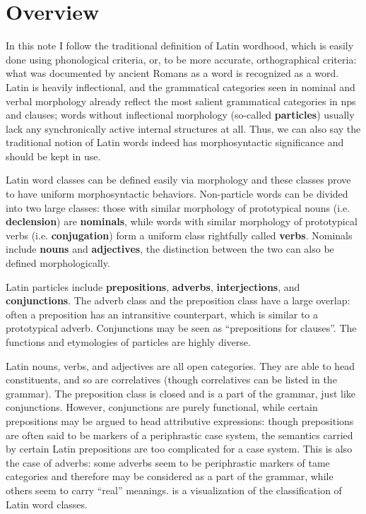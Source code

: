 \documentclass[a4paper, oneside]{report}
\newcommand*{\concept}[1]{\textbf{#1}}
\begin{document}
\section{Overview}

In this note I follow the traditional definition of Latin wordhood,
which is easily done using phonological criteria,
or, to be more accurate, orthographical criteria: 
what was documented by ancient Romans as a word 
is recognized as a word.
Latin is heavily inflectional,
and the grammatical categories seen in nominal and verbal morphology 
already reflect the most salient grammatical categories
in \acs{np}s and clauses;
words without inflectional morphology (so-called \concept{particles}) 
usually lack any synchronically active internal structures at all.
Thus, we can also say the traditional notion of Latin words 
indeed has morphosyntactic significance
and should be kept in use.


Latin word classes can be defined easily via morphology
and these classes prove to have uniform morphosyntactic behaviors.
Non-particle words can be divided into two large classes:
those with similar morphology of prototypical nouns (i.e. \concept{declension}) are \concept{nominals},
while words with similar morphology of prototypical verbs (i.e. \concept{conjugation})
form a uniform class rightfully called \concept{verbs}.
Nominals include \concept{nouns} and \concept{adjectives},
the distinction between the two can also be defined morphologically.

Latin particles include \concept{prepositions}, \concept{adverbs},
\concept{interjections}, and \concept{conjunctions}.
The adverb class and the preposition class have a large overlap:
often a preposition has an intransitive counterpart,
which is similar to a prototypical adverb.
Conjunctions may be seen as ``prepositions for clauses''.
The functions and etymologies of particles are highly diverse.

Latin nouns, verbs, and adjectives are all open categories.
They are able to head constituents,
and so are correlatives (though correlatives can be listed in the grammar).
The preposition class is closed and is a part of the grammar,
just like conjunctions.
However, conjunctions are purely functional,
while certain prepositions may be argued to head attributive expressions:
though prepositions are often said to be markers of a periphrastic case system,
the semantics carried by certain Latin prepositions are too complicated for a case system.
This is also the case of adverbs:
some adverbs seem to be periphrastic markers of \acs{tame} categories
and therefore may be considered as a part of the grammar,
while others seem to carry ``real'' meanings.
 is a visualization of the classification of Latin word classes.
\end{document}
